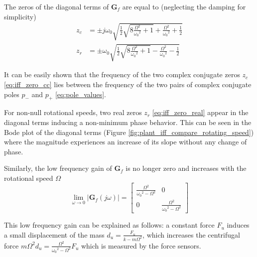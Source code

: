 \documentclass{ISMA_USD2020}
\begin{document}
The zeros of the diagonal terms of \(\bm{G}_f\) are equal to (neglecting the damping for simplicity)
\begin{subequations}
  \begin{align}
    z_c &= \pm j \omega_0 \sqrt{\frac{1}{2} \sqrt{8 \frac{\Omega^2}{{\omega_0}^2} + 1} + \frac{\Omega^2}{{\omega_0}^2} + \frac{1}{2} } \label{eq:iff_zero_cc} \\
    z_r &= \pm   \omega_0 \sqrt{\frac{1}{2} \sqrt{8 \frac{\Omega^2}{{\omega_0}^2} + 1} - \frac{\Omega^2}{{\omega_0}^2} - \frac{1}{2} } \label{eq:iff_zero_real}
  \end{align}
\end{subequations}

It can be easily shown that the frequency of the two complex conjugate zeros \(z_c\) \eqref{eq:iff_zero_cc} lies between the frequency of the two pairs of complex conjugate poles \(p_{-}\) and \(p_{+}\) \eqref{eq:pole_values}.

For non-null rotational speeds, two real zeros \(z_r\) \eqref{eq:iff_zero_real} appear in the diagonal terms inducing a non-minimum phase behavior.
This can be seen in the Bode plot of the diagonal terms (Figure \ref{fig:plant_iff_compare_rotating_speed}) where the magnitude experiences an increase of its slope without any change of phase.

Similarly, the low frequency gain of \(\bm{G}_f\) is no longer zero and increases with the rotational speed \(\Omega\)
\begin{equation}
\label{low_freq_gain_iff_plan}
  \lim_{\omega \to 0} \left| \bm{G}_f (j\omega) \right| = \begin{bmatrix}
  \frac{\Omega^2}{{\omega_0}^2 - \Omega^2} & 0 \\
  0  & \frac{\Omega^2}{{\omega_0}^2 - \Omega^2}
\end{bmatrix}
\end{equation}

This low frequency gain can be explained as follows: a constant force \(F_u\) induces a small displacement of the mass \(d_u = \frac{F_u}{k - m\Omega^2}\), which increases the centrifugal force \(m\Omega^2d_u = \frac{\Omega^2}{{\omega_0}^2 - \Omega^2} F_u\) which is measured by the force sensors.
\end{document}
